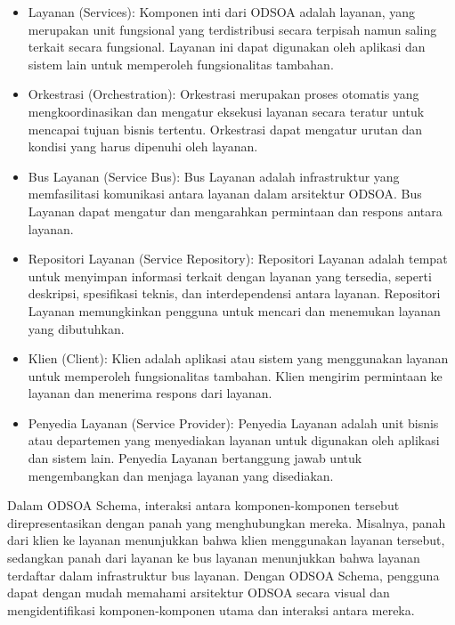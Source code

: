 \documentclass{article}
\begin{document}
\begin{itemize}
	\item Layanan (Services): Komponen inti dari ODSOA adalah layanan, yang merupakan unit fungsional yang terdistribusi secara terpisah namun saling terkait secara fungsional. Layanan ini dapat digunakan oleh aplikasi dan sistem lain untuk memperoleh fungsionalitas 				tambahan.

	\item Orkestrasi (Orchestration): Orkestrasi merupakan proses otomatis yang mengkoordinasikan dan mengatur eksekusi layanan secara teratur untuk mencapai tujuan bisnis tertentu. Orkestrasi dapat mengatur urutan dan kondisi yang harus dipenuhi oleh layanan.

	\item Bus Layanan (Service Bus): Bus Layanan adalah infrastruktur yang memfasilitasi komunikasi antara layanan dalam arsitektur ODSOA. Bus Layanan dapat mengatur dan mengarahkan permintaan dan respons antara layanan.

	\item Repositori Layanan (Service Repository): Repositori Layanan adalah tempat untuk menyimpan informasi terkait dengan layanan yang tersedia, seperti deskripsi, spesifikasi teknis, dan interdependensi antara layanan. Repositori Layanan memungkinkan pengguna 			untuk mencari dan menemukan layanan yang dibutuhkan.

	\item Klien (Client): Klien adalah aplikasi atau sistem yang menggunakan layanan untuk memperoleh fungsionalitas tambahan. Klien mengirim permintaan ke layanan dan menerima respons dari layanan.

	\item Penyedia Layanan (Service Provider): Penyedia Layanan adalah unit bisnis atau departemen yang menyediakan layanan untuk digunakan oleh aplikasi dan sistem lain. Penyedia Layanan bertanggung jawab untuk mengembangkan dan menjaga layanan yang 			disediakan.
\end{itemize}

	Dalam ODSOA Schema, interaksi antara komponen-komponen tersebut direpresentasikan dengan panah yang menghubungkan mereka. Misalnya, panah dari klien ke layanan menunjukkan bahwa klien menggunakan layanan tersebut, sedangkan panah dari layanan ke bus 		layanan menunjukkan bahwa layanan terdaftar dalam infrastruktur bus layanan. Dengan ODSOA Schema, pengguna dapat dengan mudah memahami arsitektur ODSOA secara visual dan mengidentifikasi komponen-komponen utama dan interaksi antara mereka.
\end{document}

